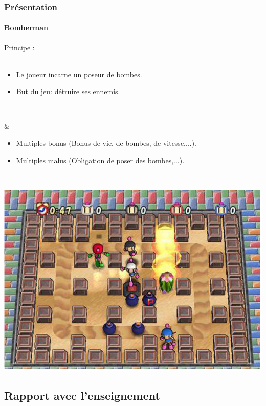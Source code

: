 \begin{frame}
\frametitle{Présentation}
\framesubtitle{Bomberman}
Principe : \\ \\

\begin{minipage}{5cm}
	\begin{itemize}
		\item Le joueur incarne un poseur de bombes.
		\item But du jeu: détruire ses ennemis.
	\end{itemize} \\
\end{minipage} &  \begin{minipage}{5.5cm}
	\begin{itemize}
		\item Multiples bonus (Bonus de vie, de bombes, de vitesse,...).
		\item Multiples malus (Obligation de poser des bombes,...).
	\end{itemize} \\
\end{minipage} 

\begin{center} \includegraphics[scale=0.35]{img/bomberman2.eps} \end{center}

\end{frame}


\subsection{Rapport avec l'enseignement}


